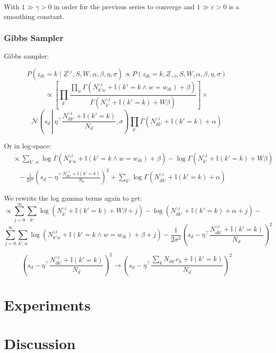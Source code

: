 \documentclass[a4paper,10pt]{article}
\renewcommand{\epsilon}{\varepsilon}
\begin{document}
With $1 \gg \gamma > 0$ in order for the previous series to converge and $1 \gg \epsilon > 0$ is a smoothing constant.

\subsubsection{Gibbs Sampler}
Gibbs sampler:

$$ P(z_{di} = k \mid Z^{\backslash i}, S, W, \alpha, \beta, \eta, \sigma) \propto P(z_{di} = k, Z_{-i}, S, W, \alpha, \beta, \eta, \sigma) $$
$$ \propto \left[ \prod_{k'} \frac{\prod_w \Gamma(N_{{k'}w}^{\backslash i} + \mathbb{I}(k' = k \wedge w = w_{di}) + \beta)}{\Gamma(N_{k'}^{\backslash i} + \mathbb{I}(k' = k) + W \beta)} \right] \times $$
$$ \mathcal{N}\left(s_d\, \left|\, \eta^\top\frac{N_{d{k'}}^{\backslash i} + \mathbb{I}(k' = k)}{N_d}, \sigma\right. \right) \prod_{k'} \Gamma(N_{d{k'}}^{\backslash i} + \mathbb{I}(k' = k) + \alpha) $$

Or in log-space:
\begin{align*}
&\propto \sum_{k',w} \log \Gamma(N_{{k'}w}^{\backslash i} + \mathbb{I}(k' = k \wedge w = w_{di}) + \beta) - \log \Gamma(N_{k'}^{\backslash i} + \mathbb{I}(k' = k) + W \beta)\\
&\hspace{10pt}-\frac{1}{2 \sigma^2}\left(s_d - \eta^\top \frac{N_{d{k'}}^{\backslash i} + \mathbb{I}(k' = k)}{N_d}\right)^2 + \sum_{k'} \log \Gamma(N_{d{k'}}^{\backslash i} + \mathbb{I}(k' = k) + \alpha)
\end{align*}
  


We rewrite the log gamma terms again to get:
\[\propto \sum_{j=0}^\infty \sum_{k'}\log(N_{k'}^{\backslash i} + \mathbb{I}(k' = k) + W \beta + j) 
-\log(N_{d{k'}}^{\backslash i} + \mathbb{I}(k' = k) + \alpha +j)-\]
\[\sum_{j=0}^\infty \sum_{k',w} \log(N_{{k'}w}^{\backslash i} + \mathbb{I}(k' = k \wedge w = w_{di}) + \beta + j) -\frac{1}{2 \sigma^2}\left(s_d - \eta^\top \frac{N_{d{k'}}^{\backslash i} + \mathbb{I}(k' = k)}{N_d}\right)^2\]

\[\left(s_d - \eta^\top \frac{N_{d{k'}}^{\backslash i} + \mathbb{I}(k' = k)}{N_d}\right)^2 \rightarrow \left(s_d - \eta^\top \frac{\sum_k N_{d{k'}}e_k  + \mathbb{I}(k' = k)}{N_d}\right)^2\]


\section{Experiments}

\section{Discussion}
\end{document}
